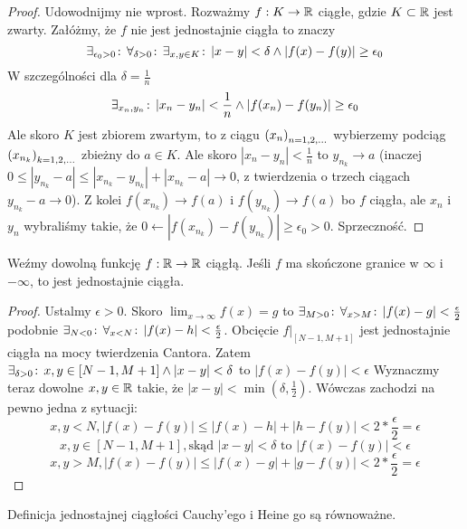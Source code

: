 \documentclass[9pt]{article}
\begin{document}
\begin{proof}
    Udowodnijmy nie wprost. Rozważmy $f: K \to \mathbb{R}$ ciągłe, gdzie $K \subset \mathbb{R}$ jest zwarty.
    Załóżmy, że $f$ nie jest jednostajnie ciągła to znaczy
    \[
        \exists_{\epsilon_0 > 0} \! : \,
        \forall_{\delta > 0} \! : \,
        \exists_{x, y \in K} \! : \,
        |x-y| < \delta \land |f(x) - f(y)| \ge \epsilon_0
    \]
    W szczególności dla $\delta = \frac{1}{n}$
    \[
        \exists_{x_n, y_n} \! : \,
        |x_n-y_n| < \frac{1}{n} \land |f(x_n) - f(y_n)| \ge \epsilon_0
    \]
    Ale skoro $K$ jest zbiorem zwartym, to z ciągu $\left(x_n\right)_{n = 1,2,...}$ wybierzemy podciąg
    $\left(x_{n_k}\right)_{k = 1,2,...}$ zbieżny do $a \in K$. Ale skoro $|x_n - y_n| < \frac{1}{n}$ to
    $y_{n_k} \to a$ (inaczej $0 \le |y_{n_k} - a| \le |x_{n_k} - y_{n_k}| + |x_{n_k} - a| \to 0$, z
    twierdzenia o trzech ciągach $y_{n_k} - a \to 0$). Z kolei
    $f(x_{n_k}) \to f(a)$ i $f(y_{n_k}) \to f(a)$ bo $f$ ciągła, ale $x_n$ i $y_n$ wybraliśmy takie,
    że $0 \leftarrow\left|f(x_{n_k}) - f(y_{n_k})\right| \ge \epsilon_0 > 0$. Sprzeczność.
\end{proof}

\begin{Twi}
    Weźmy dowolną funkcję $f: \mathbb{R} \to \mathbb{R}$ ciągłą. Jeśli $f$ ma skończone granice w $\infty$ i
    $-\infty$, to jest jednostajnie ciągła.
\end{Twi}

\begin{proof}
    Ustalmy $\epsilon > 0$. Skoro $\lim_{x \to \infty} f(x) = g$ to
    $\exists_{M > 0} \! : \, \forall_{x > M} \! : \, |f(x) - g| < \frac{\epsilon}{2}$ podobnie
    $\exists_{N < 0} \! : \, \forall_{x < N} \! : \, |f(x) - h| < \frac{\epsilon}{2}$. Obcięcie
    $f|_{[N-1, M+1]}$ jest jednostajnie ciągła na mocy twierdzenia Cantora.
    Zatem $\exists_{\delta > 0} \! : \, x,y \in [N-1, M+1] \land |x-y| < \delta$ to
    $|f(x) - f(y)| < \epsilon$ Wyznaczmy teraz dowolne $x, y \in \mathbb{R}$ takie, że
    $|x-y| < \min (\delta, \frac{1}{2})$. Wówczas zachodzi na pewno jedna z sytuacji:
    \[
        x, y < N,  |f(x)-f(y)| \le |f(x)-h| + |h-f(y)| < 2*\frac{\epsilon}{2} = \epsilon
    \]
    \[
        x, y \in [N-1, M+1], \text{skąd } |x-y| < \delta \text{ to } |f(x) - f(y)| < \epsilon
    \]
    \[
        x, y > M, |f(x) - f(y)| \le |f(x)-g| + |g-f(y)| < 2* \frac{\epsilon}{2} = \epsilon
    \]
\end{proof}

\begin{Twi}
    Definicja jednostajnej ciągłości Cauchy'ego i Heine
    go są równoważne.
\end{Twi}
\end{document}
